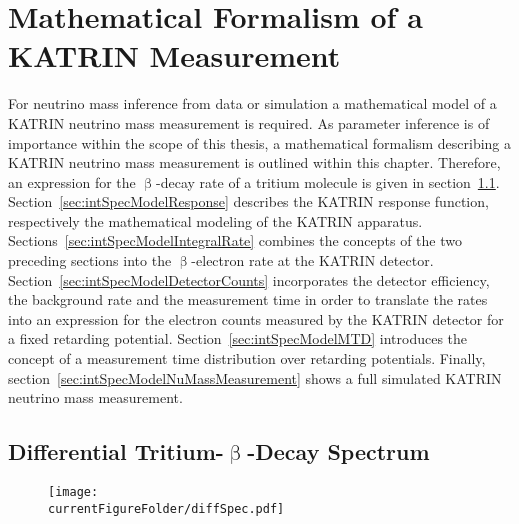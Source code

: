 \def\currentRootFolder{chapter/modelOfIntegratedRate}
\def\currentFigureFolder{\currentRootFolder/fig}



\chapter{Mathematical Formalism of a KATRIN Measurement}
\label{sec:intSpecModel}
For neutrino mass inference from data or simulation a mathematical model of a KATRIN neutrino mass measurement is required. As parameter inference is of importance within the scope of this thesis, a mathematical formalism describing a KATRIN neutrino mass measurement is outlined within this chapter. Therefore, an expression for the $\upbeta$-decay rate of a tritium molecule is given in section~\ref{sec:intSpecModelDiffSpec}. Section~\ref{sec:intSpecModelResponse} describes the KATRIN response function, respectively the mathematical modeling of the KATRIN apparatus. Sections~\ref{sec:intSpecModelIntegralRate} combines the concepts of the two preceding sections into the $\upbeta$-electron rate at the KATRIN detector. Section~\ref{sec:intSpecModelDetectorCounts} incorporates the detector efficiency, the background rate and the measurement time in order to translate the rates into an expression for the electron counts measured by the KATRIN detector for a fixed retarding potential. Section~\ref{sec:intSpecModelMTD} introduces the concept of a measurement time distribution over retarding potentials. Finally, section~\ref{sec:intSpecModelNuMassMeasurement} shows a full simulated KATRIN neutrino mass measurement.

\section{Differential Tritium-\texorpdfstring{$\upbeta$}{Beta}-Decay Spectrum}
\label{sec:intSpecModelDiffSpec}
\begin{figure}
	\centering
	\texttt{[image: \\currentFigureFolder/diffSpec.pdf]}
	\label{fig:intSpecModelDiffSpec}
\end{figure}


